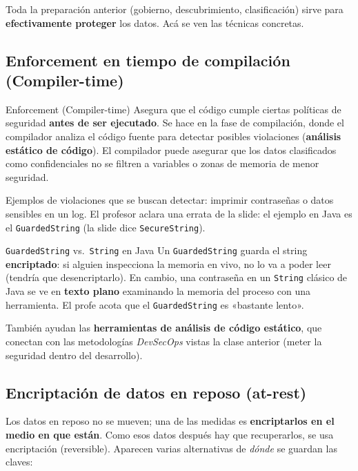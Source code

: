 \documentclass[11pt,a4paper]{article}
\begin{document}
Toda la preparación anterior (gobierno, descubrimiento, clasificación) sirve para
\textbf{efectivamente proteger} los datos. Acá se ven las técnicas concretas.

\subsection{Enforcement en tiempo de compilación (Compiler-time)}

\begin{defbox}{Enforcement (Compiler-time)}
Asegura que el código cumple ciertas políticas de seguridad \textbf{antes de ser ejecutado}.
Se hace en la fase de compilación, donde el compilador analiza el código fuente para detectar
posibles violaciones (\textbf{análisis estático de código}). El compilador puede asegurar que
los datos clasificados como confidenciales no se filtren a variables o zonas de memoria de
menor seguridad.
\end{defbox}

Ejemplos de violaciones que se buscan detectar: imprimir contraseñas o datos sensibles en un
log. El profesor aclara una errata de la slide: el ejemplo en Java es el
\texttt{GuardedString} (la slide dice \texttt{SecureString}).

\begin{notebox}{\texttt{GuardedString} vs.\ \texttt{String} en Java}
Un \texttt{GuardedString} guarda el string \textbf{encriptado}: si alguien inspecciona la
memoria en vivo, no lo va a poder leer (tendría que desencriptarlo). En cambio, una contraseña
en un \texttt{String} clásico de Java se ve en \textbf{texto plano} examinando la memoria del
proceso con una herramienta. El profe acota que el \texttt{GuardedString} es «bastante lento».

\smallskip
También ayudan las \textbf{herramientas de análisis de código estático}, que conectan con las
metodologías \emph{DevSecOps} vistas la clase anterior (meter la seguridad dentro del
desarrollo).
\end{notebox}

\subsection{Encriptación de datos en reposo (at-rest)}

Los datos en reposo no se mueven; una de las medidas es \textbf{encriptarlos en el medio en
que están}. Como esos datos después hay que recuperarlos, se usa encriptación (reversible).
Aparecen varias alternativas de \emph{dónde} se guardan las claves:
\end{document}
